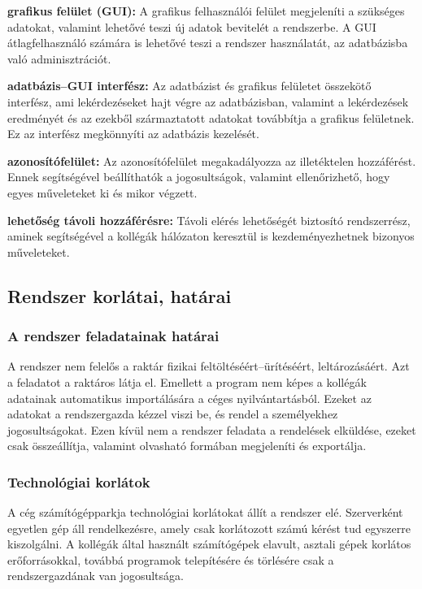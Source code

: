 \documentclass[12pt]{article}\usepackage[left=20mm,right=20mm,top=14mm,bottom=20mm]{geometry}
\begin{document}
\noindent\textbf{grafikus felület (GUI): } A grafikus felhasználói felület megjeleníti a szükséges adatokat, valamint lehetővé teszi új adatok bevitelét a rendszerbe. 
A GUI átlagfelhasználó számára is lehetővé teszi a rendszer használatát, az adatbázisba való adminisztrációt. 
\vspace{4mm}

\noindent\textbf{adatbázis--GUI interfész: } Az adatbázist és grafikus felületet összekötő interfész, ami lekérdezéseket hajt végre az adatbázisban, valamint a lekérdezések eredményét és az ezekből származtatott adatokat továbbítja a grafikus felületnek.
Ez az interfész megkönnyíti az adatbázis kezelését.
\vspace{4mm}

\noindent\textbf{azonosítófelület: } Az azonosítófelület megakadályozza az illetéktelen hozzáférést. Ennek segítségével beállíthatók a jogosultságok, valamint ellenőrizhető, hogy egyes műveleteket ki és mikor végzett.
\vspace{4mm}

\noindent\textbf{lehetőség távoli hozzáférésre: } Távoli elérés lehetőségét biztosító rendszerrész, aminek segítségével a kollégák hálózaton keresztül is kezdeményezhetnek bizonyos műveleteket.
\vspace{4mm}

\subsection{Rendszer korlátai, határai}
\subsubsection{A rendszer feladatainak határai}
A rendszer nem felelős a raktár fizikai feltöltéséért--ürítéséért, leltározásáért. Azt a feladatot a raktáros látja el.
Emellett a program nem képes a kollégák adatainak automatikus importálására a céges nyilvántartásból. 
Ezeket az adatokat a rendszergazda kézzel viszi be, és rendel a személyekhez jogosultságokat.
Ezen kívül nem a rendszer feladata a rendelések elküldése, ezeket csak összeállítja, valamint olvasható formában megjeleníti és exportálja.

\subsubsection{Technológiai korlátok}
A cég számítógépparkja technológiai korlátokat állít a rendszer elé.
Szerverként egyetlen gép áll rendelkezésre, amely csak korlátozott számú kérést tud egyszerre kiszolgálni. 
A kollégák által használt számítógépek elavult, asztali gépek korlátos erőforrásokkal, továbbá programok telepítésére és törlésére csak a rendszergazdának van jogosultsága.
\end{document}
